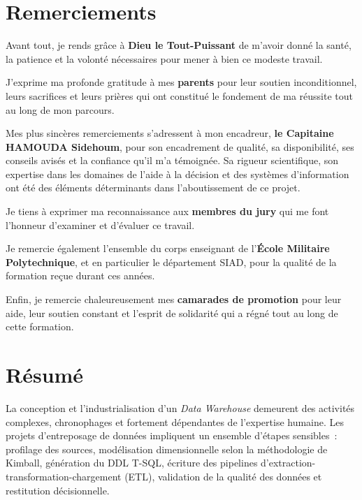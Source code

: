 \documentclass[12pt, a4paper]{report}
\begin{document}
\chapter*{Remerciements}
\thispagestyle{empty}

Avant tout, je rends grâce à \textbf{Dieu le Tout-Puissant} de m'avoir donné la santé,
la patience et la volonté nécessaires pour mener à bien ce modeste travail.

J'exprime ma profonde gratitude à mes \textbf{parents} pour leur soutien
inconditionnel, leurs sacrifices et leurs prières qui ont constitué le fondement
de ma réussite tout au long de mon parcours.

Mes plus sincères remerciements s'adressent à mon encadreur,
\textbf{le Capitaine HAMOUDA Sidehoum},
pour son encadrement de qualité, sa disponibilité, ses conseils avisés et la confiance
qu'il m'a témoignée. Sa rigueur scientifique, son expertise dans les domaines de
l'aide à la décision et des systèmes d'information ont été des éléments
déterminants dans l'aboutissement de ce projet.

Je tiens à exprimer ma reconnaissance aux \textbf{membres du jury} qui me font
l'honneur d'examiner et d'évaluer ce travail.

Je remercie également l'ensemble du corps enseignant de
l'\textbf{École Militaire Polytechnique}, et en particulier le département
SIAD, pour la qualité de la formation reçue durant ces années.

Enfin, je remercie chaleureusement mes \textbf{camarades de promotion} pour
leur aide, leur soutien constant et l'esprit de solidarité qui a régné tout
au long de cette formation.

\cleardoublepage

\chapter*{Résumé}
\thispagestyle{empty}

La conception et l'industrialisation d'un \emph{Data Warehouse} demeurent
des activités complexes, chronophages et fortement dépendantes de l'expertise
humaine. Les projets d'entreposage de données impliquent un ensemble d'étapes
sensibles~: profilage des sources, modélisation dimensionnelle selon
la méthodologie de Kimball, génération du DDL T-SQL, écriture des pipelines
d'extraction-transformation-chargement (ETL), validation de la qualité des données
et restitution décisionnelle.
\end{document}
